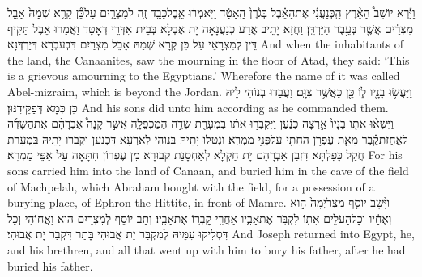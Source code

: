 {וַיַּ֡רְא יוֹשֵׁב֩ הָאָ֨רֶץ הַֽכְּנַעֲנִ֜י אֶת\maqqaf הָאֵ֗בֶל בְּגֹ֙רֶן֙ הָֽאָטָ֔ד וַיֹּ֣אמְר֔וּ אֵֽבֶל\maqqaf כָּבֵ֥ד זֶ֖ה לְמִצְרָ֑יִם עַל\maqqaf כֵּ֞ן קָרָ֤א שְׁמָהּ֙ אָבֵ֣ל מִצְרַ֔יִם אֲשֶׁ֖ר בְּעֵ֥בֶר הַיַּרְדֵּֽן׃}
{וַחֲזָא יָתֵיב אֲרַע כְּנַעֲנָאָה יָת אֶבְלָא בְּבֵית אִדְּרֵי דְּאָטָד וַאֲמַרוּ אֵבֶל תַּקִּיף דֵּין לְמִצְרָאֵי עַל כֵּן קְרָא שְׁמַהּ אָבֵל מִצְרַיִם דִּבְעִבְרָא דְּיַרְדְּנָא׃}
{And when the inhabitants of the land, the Canaanites, saw the mourning in the floor of Atad, they said: ‘This is a grievous amourning to the Egyptians.’ Wherefore the name of it was called Abel-mizraim, which is beyond the Jordan.}{}
{וַיַּעֲשׂ֥וּ בָנָ֖יו ל֑וֹ כֵּ֖ן כַּאֲשֶׁ֥ר צִוָּֽם׃}
{וַעֲבַדוּ בְנוֹהִי לֵיהּ כֵּן כְּמָא דְּפַקֵּידִנּוּן׃}
{And his sons did unto him according as he commanded them.}{}
{וַיִּשְׂא֨וּ אֹת֤וֹ בָנָיו֙ אַ֣רְצָה כְּנַ֔עַן וַיִּקְבְּר֣וּ אֹת֔וֹ בִּמְעָרַ֖ת שְׂדֵ֣ה הַמַּכְפֵּלָ֑ה אֲשֶׁ֣ר קָנָה֩ אַבְרָהָ֨ם אֶת\maqqaf הַשָּׂדֶ֜ה לַאֲחֻזַּת\maqqaf קֶ֗בֶר מֵאֵ֛ת עֶפְרֹ֥ן הַחִתִּ֖י עַל\maqqaf פְּנֵ֥י מַמְרֵֽא׃}
{וּנְטַלוּ יָתֵיהּ בְּנוֹהִי לְאַרְעָא דִּכְנַעַן וּקְבַרוּ יָתֵיהּ בִּמְעָרַת חֲקַל כָּפֵלְתָּא דִּזְבַן אַבְרָהָם יָת חַקְלָא לְאַחְסָנַת קְבוּרָא מִן עֶפְרוֹן חִתָּאָה עַל אַפֵּי מַמְרֵא׃}
{For his sons carried him into the land of Canaan, and buried him in the cave of the field of Machpelah, which Abraham bought with the field, for a possession of a burying-place, of Ephron the Hittite, in front of Mamre.}{}
{וַיָּ֨שׇׁב יוֹסֵ֤ף מִצְרַ֙יְמָה֙ ה֣וּא וְאֶחָ֔יו וְכׇל\maqqaf הָעֹלִ֥ים אִתּ֖וֹ לִקְבֹּ֣ר אֶת\maqqaf אָבִ֑יו אַחֲרֵ֖י קׇבְר֥וֹ אֶת\maqqaf אָבִֽיו׃}
{וְתָב יוֹסֵף לְמִצְרַיִם הוּא וַאֲחוֹהִי וְכָל דִּסְלִיקוּ עִמֵּיהּ לְמִקְבַּר יָת אֲבוּהִי בָּתַר דִּקְבַר יָת אֲבוּהִי׃}
{And Joseph returned into Egypt, he, and his brethren, and all that went up with him to bury his father, after he had buried his father.}{}
